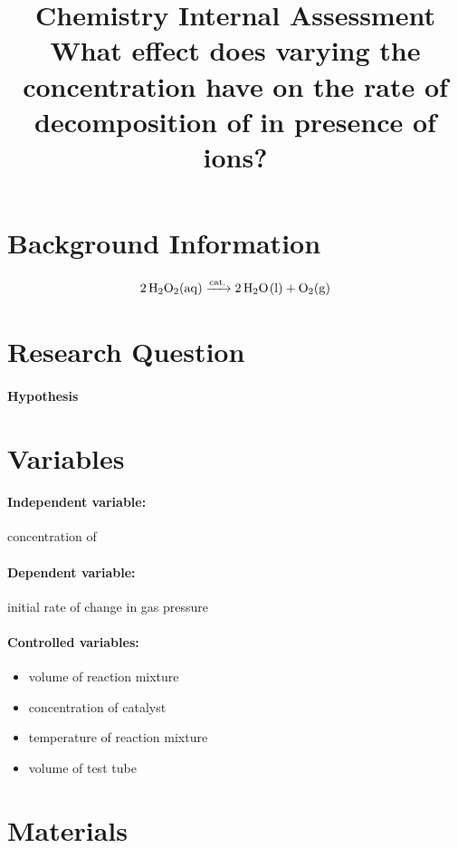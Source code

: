 \documentclass[a4paper, 12pt]{article}
\title{
\textbf{Chemistry Internal Assessment}\\
\bigskip
What effect does varying the concentration have on the rate of decomposition of \ce{H2O2} in presence of \ce{Fe^3+} ions?
}
\author{}
\date{}
\begin{document}
\maketitle

\section{Background Information}
$$\ce{2 H2O2(aq) ->[{cat.}] 2 H2O(l) + O2(g)}$$

\section{Research Question}
\paragraph{Hypothesis}

\section{Variables}
\paragraph{Independent variable:}
concentration of 

\paragraph{Dependent variable:}
initial rate of change in gas pressure

\paragraph{Controlled variables:}
\begin{itemize}
    \item volume of reaction mixture
    \item concentration of  catalyst
    \item temperature of reaction mixture
    \item volume of test tube
\end{itemize}

\section{Materials}
\end{document}
